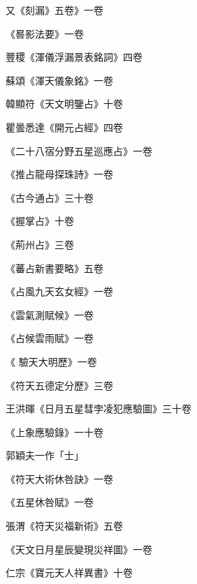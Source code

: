 \begin{pinyinscope}
 又《刻漏》五卷》一卷



 《晷影法要》一卷



 豐稷《渾儀浮漏景表銘詞》四卷



 蘇頌《渾天儀象銘》一卷



 韓顯符《天文明鑒占》十卷



 瞿曇悉達《開元占經》四卷



 《二十八宿分野五星巡應占》一卷



 《推占龍母探珠詩》一卷



 《古今通占》三十卷



 《握掌占》十卷



 《荊州占》三卷



 《蕃占新書要略》五卷



 《占風九天玄女經》一卷



 《雲氣測賦候》一卷



 《占候雲雨賦》一卷



 《
 驗天大明歷》一卷



 《符天五德定分歷》三卷



 王洪暉《日月五星彗孛凌犯應驗圖》三十卷



 《上象應驗錄》一十卷



 郭穎夫一作「士」



 《符天大術休咎訣》一卷



 《五星休咎賦》一卷



 張渭《符天災福新術》五卷



 《天文日月星辰變現災祥圖》一卷



 仁宗《寶元天人祥異書》十卷




\end{pinyinscope}
